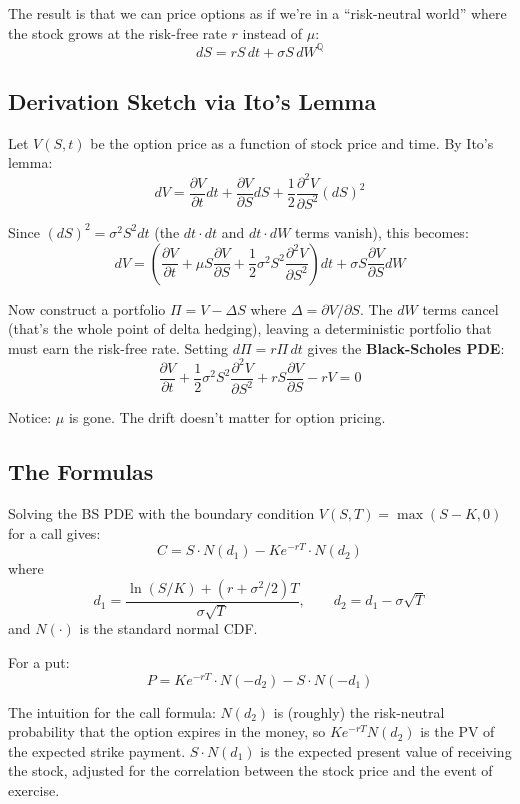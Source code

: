 \documentclass[11pt]{article}
\begin{document}
The result is that we can price options as if we're in a ``risk-neutral world'' where the stock grows at the risk-free rate $r$ instead of $\mu$:
\[
dS = rS \, dt + \sigma S \, dW^{\mathbb{Q}}
\]

\subsection{Derivation Sketch via Ito's Lemma}

Let $V(S,t)$ be the option price as a function of stock price and time. By Ito's lemma:
\[
dV = \frac{\partial V}{\partial t} dt + \frac{\partial V}{\partial S} dS + \frac{1}{2} \frac{\partial^2 V}{\partial S^2} (dS)^2
\]

Since $(dS)^2 = \sigma^2 S^2 dt$ (the $dt \cdot dt$ and $dt \cdot dW$ terms vanish), this becomes:
\[
dV = \left(\frac{\partial V}{\partial t} + \mu S \frac{\partial V}{\partial S} + \frac{1}{2}\sigma^2 S^2 \frac{\partial^2 V}{\partial S^2}\right) dt + \sigma S \frac{\partial V}{\partial S} dW
\]

Now construct a portfolio $\Pi = V - \Delta S$ where $\Delta = \partial V / \partial S$. The $dW$ terms cancel (that's the whole point of delta hedging), leaving a deterministic portfolio that must earn the risk-free rate. Setting $d\Pi = r\Pi \, dt$ gives the \textbf{Black-Scholes PDE}:
\[
\boxed{\frac{\partial V}{\partial t} + \frac{1}{2}\sigma^2 S^2 \frac{\partial^2 V}{\partial S^2} + rS\frac{\partial V}{\partial S} - rV = 0}
\]

Notice: $\mu$ is gone. The drift doesn't matter for option pricing.

\subsection{The Formulas}

Solving the BS PDE with the boundary condition $V(S,T) = \max(S-K, 0)$ for a call gives:
\[
\boxed{C = S \cdot N(d_1) - K e^{-rT} \cdot N(d_2)}
\]
where
\[
d_1 = \frac{\ln(S/K) + (r + \sigma^2/2)T}{\sigma\sqrt{T}}, \qquad d_2 = d_1 - \sigma\sqrt{T}
\]
and $N(\cdot)$ is the standard normal CDF.

For a put:
\[
P = K e^{-rT} \cdot N(-d_2) - S \cdot N(-d_1)
\]

The intuition for the call formula: $N(d_2)$ is (roughly) the risk-neutral probability that the option expires in the money, so $K e^{-rT} N(d_2)$ is the PV of the expected strike payment. $S \cdot N(d_1)$ is the expected present value of receiving the stock, adjusted for the correlation between the stock price and the event of exercise.
\end{document}
